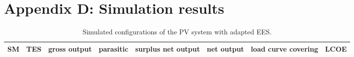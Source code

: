 \chapter{Appendix D: Simulation results} \label{Simulation results}
%

\begin{sidewaystable} 
  \centering
\begin{tabular}{ p{2.0cm} C{2.0cm} C{2.0cm} C{2.0cm} C{2.0cm} C{2.0cm} C{2.0cm} C{2.0cm} } 
	\hline	
\textbf{SM} & \textbf{TES} & \textbf{gross output} & \textbf{parasitic} & \textbf{surplus net output} & \textbf{net output} & \textbf{load curve covering} & \textbf{LCOE} \\ \hline \hline

\end{tabular}
\caption[Simulated configurations of the PV system with adapted EES.]{Simulated configurations of the PV system with adapted EES.}\label{tbl: PV_OverallConfig}
\end{sidewaystable} 



\pagebreak